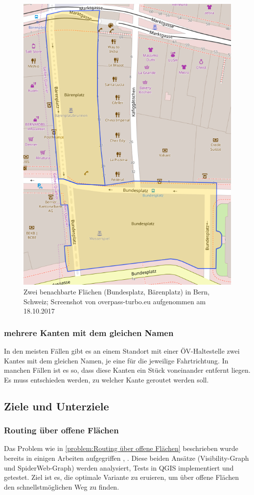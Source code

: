 \begin{figure}[ht]
\centering
\includegraphics[width=0.5\linewidth]{technicalreport/img/bundesplatz_baerenplatz}
\caption[Zwei benachbarte Flächen]{Zwei benachbarte Flächen (Bundesplatz, Bärenplatz) in Bern, Schweiz; Screenshot von overpass-turbo.eu aufgenommen am 18.10.2017}
\label{fig:bundesplatz_baerenplatz}
\end{figure}

\subsubsection{mehrere Kanten mit dem gleichen Namen}
\label{problem:mehrere Kanten mit dem gleichen Namen}
In den meisten Fällen gibt es an einem Standort mit einer ÖV-Haltestelle zwei \glspl{Kante} mit dem gleichen Namen, je eine für die jeweilige Fahrtrichtung. In manchen Fällen ist es so, dass diese Kanten ein Stück voneinander entfernt liegen. Es muss entschieden werden, zu welcher Kante geroutet werden soll.
	
\subsection{Ziele und Unterziele}
\label{Ziele und Unterziele}

\subsubsection{Routing über offene Flächen}
\label{target:Routing über offene Flächen}
Das Problem wie in \ref{problem:Routing über offene Flächen} beschrieben wurde bereits in einigen Arbeiten aufgegriffen \cite{graser_visibility_graph}, \cite{dzafic_spider_web_graph}. Diese beiden Ansätze (Visibility-Graph und SpiderWeb-Graph) werden analysiert, Tests in QGIS implementiert und getestet. Ziel ist es, die optimale Variante zu eruieren, um über offene Flächen den schnellstmöglichen Weg zu finden.

